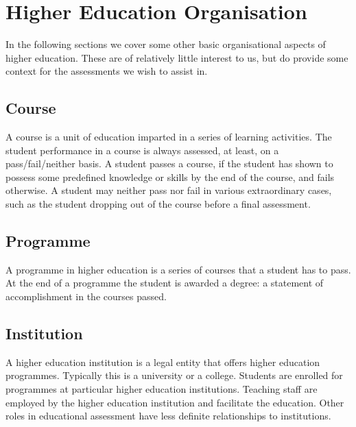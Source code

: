 
\section{Higher Education Organisation}

In the following sections we cover some other basic organisational aspects of
higher education. These are of relatively little interest to us, but do provide
some context for the assessments we wish to assist in.

\subsection{Course}

A course is a unit of education imparted in a series of learning activities.
The student performance in a course is always assessed, at least, on a
pass/fail/neither basis. A student passes a course, if the student has shown to
possess some predefined knowledge or skills by the end of the course, and fails
otherwise.  A student may neither pass nor fail in various extraordinary cases,
such as the student dropping out of the course before a final assessment.

\subsection{Programme}

A programme in higher education is a series of courses that a student has to
pass. At the end of a programme the student is awarded a degree: a statement of
accomplishment in the courses passed.

\subsection{Institution}

A higher education institution is a legal entity that offers higher education
programmes. Typically this is a university or a college. Students are enrolled
for programmes at particular higher education institutions. Teaching staff are
employed by the higher education institution and facilitate the education.
Other roles in educational assessment have less definite relationships to
institutions.
